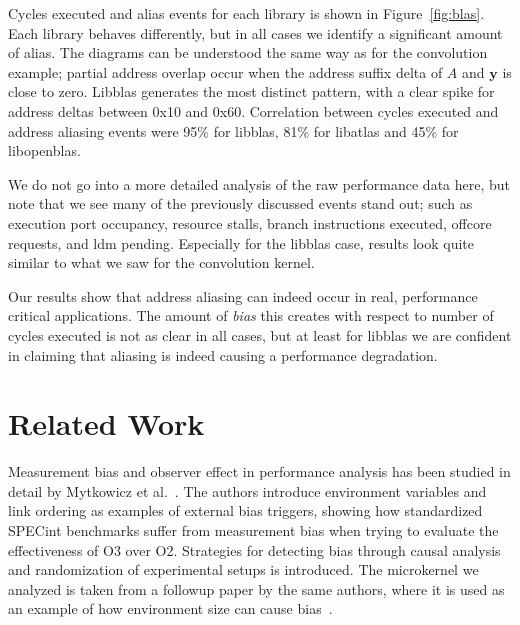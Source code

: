 \documentclass[10pt, conference, compsocconf]{IEEEtran}
\begin{document}
Cycles executed and alias events for each library is shown in Figure~\ref{fig:blas}.
Each library behaves differently, but in all cases we identify a significant amount of alias. 
The diagrams can be understood the same way as for the convolution example; partial address overlap occur when the address suffix delta of $A$ and $\boldsymbol{y}$ is close to zero.
Libblas generates the most distinct pattern, with a clear spike for address deltas between 0x10 and 0x60.
Correlation between cycles executed and address aliasing events were 95\% for libblas, 81\% for libatlas and 45\% for libopenblas.

We do not go into a more detailed analysis of the raw performance data here, but note that we see many of the previously discussed events stand out; such as execution port occupancy, resource stalls, branch instructions executed, offcore requests, and ldm pending.
Especially for the libblas case, results look quite similar to what we saw for the convolution kernel.

Our results show that address aliasing can indeed occur in real, performance critical applications.
The amount of \emph{bias} this creates with respect to number of cycles executed is not as clear in all cases, but at least for libblas we are confident in claiming that aliasing is indeed causing a performance degradation.


\section{Related Work}
\label{sec:related}
Measurement bias and observer effect in performance analysis has been studied in detail by Mytkowicz et al.~\cite{Mytkowicz:2008:OE&MB,Mytkowicz:2008:Easy}.
The authors introduce environment variables and link ordering as examples of external bias triggers, showing how standardized {\small SPECint} benchmarks suffer from measurement bias when trying to evaluate the effectiveness of O3 over O2. 
Strategies for detecting bias through causal analysis and randomization of experimental setups is introduced.
The microkernel we analyzed is taken from a followup paper by the same authors, where it is used as an example of how environment size can cause bias~\cite{Mytkowicz:2009:WrongData}.
\end{document}
